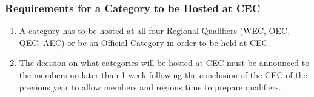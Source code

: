 \subsubsection{Requirements for a Category to be Hosted at CEC}
\label{requirements-for-a-category-to-be-hosted-at-cec}

\begin{enumerate}
 \item
  A category has to be hosted at all four Regional Qualifiers (WEC, OEC, QEC, AEC) or be an Official Category in order to be held at CEC.
 \item
  The decision on what categories will be hosted at CEC must be announced to the members no later than 1 week following the conclusion of the CEC of the previous year to allow members and regions time to prepare qualifiers.
\end{enumerate}
